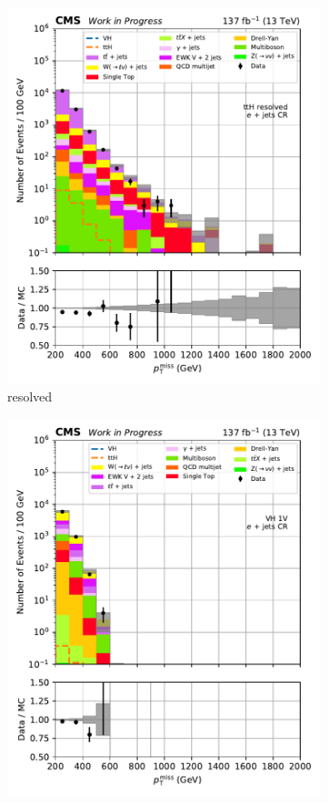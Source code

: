 \begin{figure}[htbp]
\begin{subfigure}[b]{0.24\textwidth}
        \includegraphics[width=\textwidth]{figures/region_plots/2016to18/region_3/ttH_resolved.pdf}
        \caption{\ttH resolved}
    \end{subfigure}
    \hfill
    \begin{subfigure}[b]{0.24\textwidth}
        \includegraphics[width=\textwidth]{figures/region_plots/2016to18/region_3/VH_1V.pdf}

\end{subfigure}
\end{figure}
